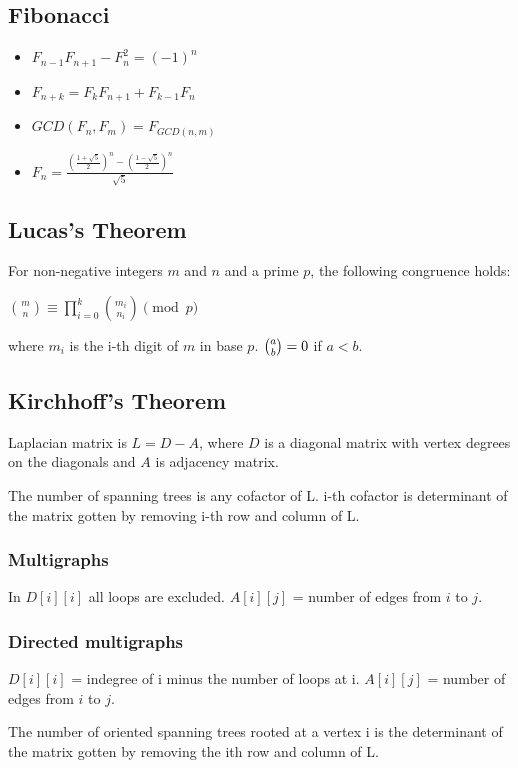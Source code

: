\documentclass[a4paper,10pt,oneside]{article}
\begin{document}
\begin{multicols}{2}
\subsection{Fibonacci}
\begin{itemize}
\item $F_{n-1}F_{n+1} - F_n^2 = (-1)^n$
\item $F_{n+k} = F_kF_{n+1} + F_{k-1}F_n$
\item $GCD(F_n, F_m) = F_{GCD(n, m)}$
\item $F_n = \frac{(\frac{1+\sqrt{5}}{2})^n - (\frac{1-\sqrt{5}}{2})^n}{\sqrt{5}}$
\end{itemize}

\subsection{Lucas's Theorem}
For non-negative integers $m$ and $n$ and a prime $p$, the following congruence holds:

$\displaystyle \binom{m}{n} \equiv \prod_{i = 0}^{k} \binom{m_i}{n_i} \pmod p$

where $m_i$ is the i-th digit of $m$ in base $p$. ${\displaystyle {\tbinom {a}{b}}=0}$ if $a < b$.

\subsection{Kirchhoff's Theorem}
Laplacian matrix is $L = D - A$, where $D$ is a diagonal matrix with vertex degrees on the diagonals and $A$ is adjacency matrix.

The number of spanning trees is any cofactor of L. i-th cofactor is determinant of the matrix gotten by removing i-th row and column of L.

\subsubsection{Multigraphs}
In $D[i][i]$ all loops are excluded. $A[i][j]$ = number of edges from $i$ to $j$.

\subsubsection{Directed multigraphs}
$D[i][i]$ = indegree of i minus the number of loops at i. $A[i][j]$ = number of edges from $i$ to $j$.

The number of oriented spanning trees rooted at a vertex i is the determinant of the matrix gotten by removing the ith row and column of L.


\end{multicols}
\end{document}
